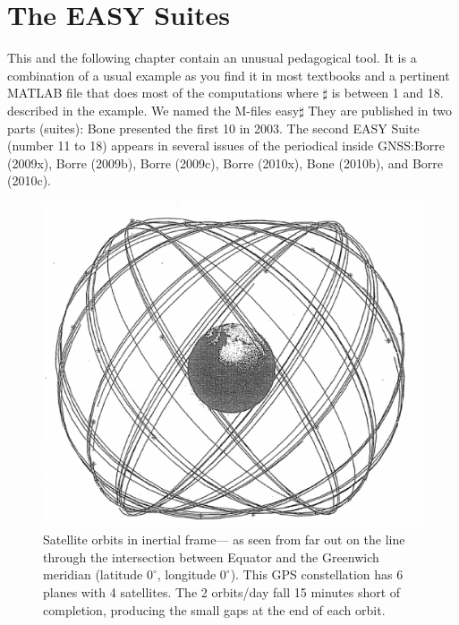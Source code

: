 \section{The EASY Suites}
This and the following chapter contain an unusual pedagogical tool. It is a combination of a usual example as you find it in most textbooks and a pertinent MATLAB file that does most of the computations where $\sharp$ is between 1 and 18. described in the example. We named the M-files easy$\sharp$ They are published in two parts (suites): Bone presented the first 10 in 2003. The second EASY Suite (number 11 to 18) appears in several issues of the periodical inside GNSS:Borre (2009x), Borre (2009b), Borre (2009c), Borre (2010x), Bone (2010b), and Borre (2010c).
\begin{figure}
	\centering
	\includegraphics[width=0.4\linewidth]{TeX_files/Part03/chapter09/image/9-1}
	\caption{Satellite orbits in inertial frame— as seen from far out on the line through the intersection between Equator and the Greenwich meridian (latitude $0^\circ$, longitude $0^\circ$). This GPS constellation has 6 planes with 4 satellites. The 2 orbits/day fall 15 minutes short of completion, producing the small gaps at the end of each orbit.}
	\label{fig:9-1}
\end{figure}
